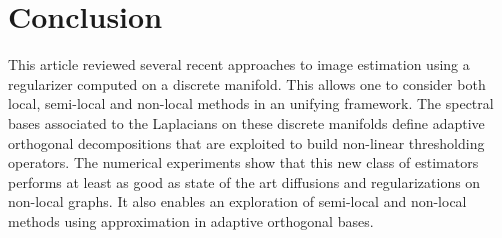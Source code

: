 \documentclass[final]{siamltex}
\begin{document}
\section*{Conclusion}

This article reviewed several recent approaches to image estimation using a regularizer computed on a discrete manifold. This allows one to consider both local, semi-local and non-local methods in an unifying framework. The spectral bases associated to the Laplacians on these discrete manifolds define adaptive orthogonal decompositions that are exploited to build non-linear thresholding operators. The numerical experiments show that this new class of estimators performs at least as good as state of the art diffusions and regularizations on non-local graphs. It also enables an exploration of semi-local and non-local methods using approximation in adaptive orthogonal bases.



\end{document}
